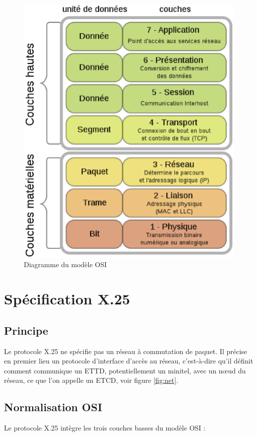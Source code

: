 \documentclass[12pt]{report}
\begin{document}
\begin{figure}[htp]
  \centering
  \includegraphics[scale=0.5]{images/osi}
  \caption{Diagramme du modèle OSI}
  \label{fig:osi}
\end{figure}

\section{Spécification X.25}
\subsection{Principe}
Le protocole X.25 ne spécifie pas un réseau à commutation de paquet. Il précise en premier lieu un protocole d'interface d'accès au réseau, c'est-à-dire qu'il définit comment communique un \gls{ETTD},
potentiellement un minitel, avec un nœud du réseau, ce que l'on appelle un \gls{ETCD}\cite{cnam}, voir figure \ref{fig:net}.

\subsection{Normalisation OSI}
Le protocole X.25 intègre les trois couches basses du modèle OSI :
\end{document}
